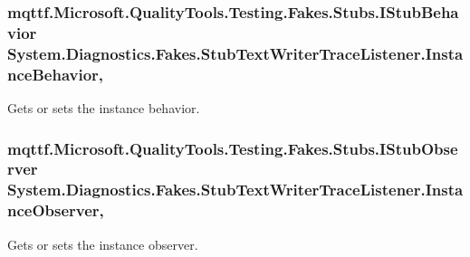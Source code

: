 \hypertarget{class_system_1_1_diagnostics_1_1_fakes_1_1_stub_text_writer_trace_listener_ae1bb784928fc0481fc95aeba1d18e00b}{
\subsubsection[{Instance\-Behavior}]{\setlength{\rightskip}{0pt plus 5cm}mqttf.\-Microsoft.\-Quality\-Tools.\-Testing.\-Fakes.\-Stubs.\-I\-Stub\-Behavior System.\-Diagnostics.\-Fakes.\-Stub\-Text\-Writer\-Trace\-Listener.\-Instance\-Behavior\hspace{0.3cm}{\ttfamily [get]}, {\ttfamily [set]}}}\label{class_system_1_1_diagnostics_1_1_fakes_1_1_stub_text_writer_trace_listener_ae1bb784928fc0481fc95aeba1d18e00b}


Gets or sets the instance behavior.

\hypertarget{class_system_1_1_diagnostics_1_1_fakes_1_1_stub_text_writer_trace_listener_ae202cf6c5025296e3662ec057e81f267}{
\subsubsection[{Instance\-Observer}]{\setlength{\rightskip}{0pt plus 5cm}mqttf.\-Microsoft.\-Quality\-Tools.\-Testing.\-Fakes.\-Stubs.\-I\-Stub\-Observer System.\-Diagnostics.\-Fakes.\-Stub\-Text\-Writer\-Trace\-Listener.\-Instance\-Observer\hspace{0.3cm}{\ttfamily [get]}, {\ttfamily [set]}}}\label{class_system_1_1_diagnostics_1_1_fakes_1_1_stub_text_writer_trace_listener_ae202cf6c5025296e3662ec057e81f267}


Gets or sets the instance observer.

